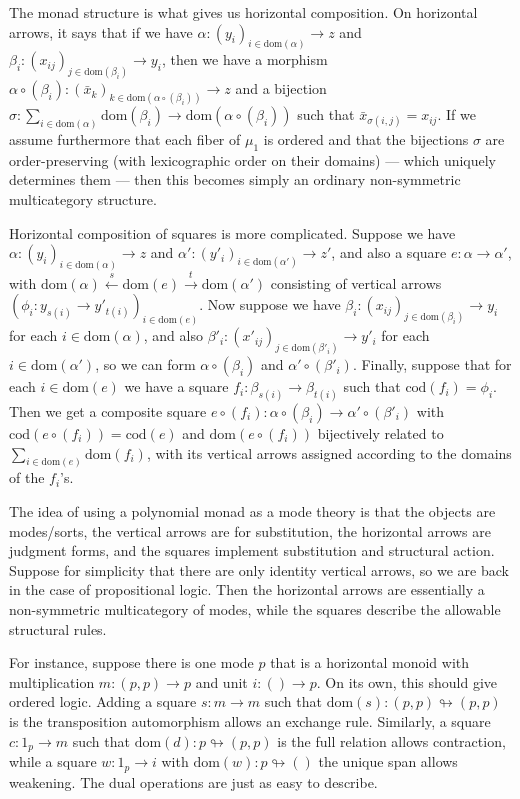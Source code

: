 \documentclass{article}
\theoremstyle{definition}
\theoremstyle{remark}
\let\sto\looparrowright
\def\dom{\mathrm{dom}}
\def\cod{\mathrm{cod}}
\let\xto\xrightarrow
\let\xot\xleftarrow
\begin{document}
The monad structure is what gives us horizontal composition.
On horizontal arrows, it says that if we have $\alpha : (y_i)_{i\in\dom(\alpha)} \to z$ and $\beta_i : (x_{ij})_{j\in \dom(\beta_i)} \to y_i$, then we have a morphism $\alpha \circ (\beta_i) : (\bar x_k)_{k\in \dom(\alpha \circ (\beta_i))} \to z$ and a bijection $\sigma : \sum_{i\in \dom(\alpha)} \dom(\beta_i) \to \dom(\alpha \circ (\beta_i))$ such that $\bar x_{\sigma(i,j)} = x_{ij}$.
If we assume furthermore that each fiber of $\mu_1$ is ordered and that the bijections $\sigma$ are order-preserving (with lexicographic order on their domains) --- which uniquely determines them --- then this becomes simply an ordinary non-symmetric multicategory structure.

Horizontal composition of squares is more complicated.
Suppose we have $\alpha : (y_i)_{i\in\dom(\alpha)} \to z$ and $\alpha' : (y'_i)_{i\in\dom(\alpha')} \to z'$, and also a square $e:\alpha\to \alpha'$, with $\dom(\alpha) \xot{s} \dom(e) \xto{t} \dom(\alpha')$ consisting of vertical arrows $(\phi_i : y_{s(i)} \to y'_{t(i)})_{i\in \dom(e)}$.
Now suppose we have $\beta_i : (x_{ij})_{j\in \dom(\beta_i)} \to y_i$ for each $i\in\dom(\alpha)$, and also $\beta'_i : (x'_{ij})_{j\in \dom(\beta'_i)} \to y'_i$ for each $i\in\dom(\alpha')$, so we can form $\alpha \circ (\beta_i)$ and $\alpha' \circ (\beta'_i)$.
Finally, suppose that for each $i\in \dom(e)$ we have a square $f_i : \beta_{s(i)} \to \beta_{t(i)}$ such that $\cod(f_i) = \phi_i$.
Then we get a composite square $e\circ (f_i) : \alpha \circ (\beta_i) \to \alpha' \circ (\beta'_i)$ with $\cod(e\circ (f_i)) = \cod(e)$ and $\dom(e\circ(f_i))$ bijectively related to $\sum_{i\in \dom(e)} \dom(f_i)$, with its vertical arrows assigned according to the domains of the $f_i$'s.

The idea of using a polynomial monad as a mode theory is that the objects are modes/sorts, the vertical arrows are for substitution, the horizontal arrows are judgment forms, and the squares implement substitution and structural action.
Suppose for simplicity that there are only identity vertical arrows, so we are back in the case of propositional logic.
Then the horizontal arrows are essentially a non-symmetric multicategory of modes, while the squares describe the allowable structural rules.

For instance, suppose there is one mode $p$ that is a horizontal monoid with multiplication $m:(p,p)\to p$ and unit $i:()\to p$.
On its own, this should give ordered logic.
Adding a square $s:m\to m$ such that $\dom(s) : (p,p) \sto (p,p)$ is the transposition automorphism allows an exchange rule.
Similarly, a square $c:1_p \to m$ such that $\dom(d): p \sto (p,p)$ is the full relation allows contraction, while a square $w:1_p \to i$ with $\dom(w):p \sto ()$ the unique span allows weakening.
The dual operations are just as easy to describe.
\end{document}

